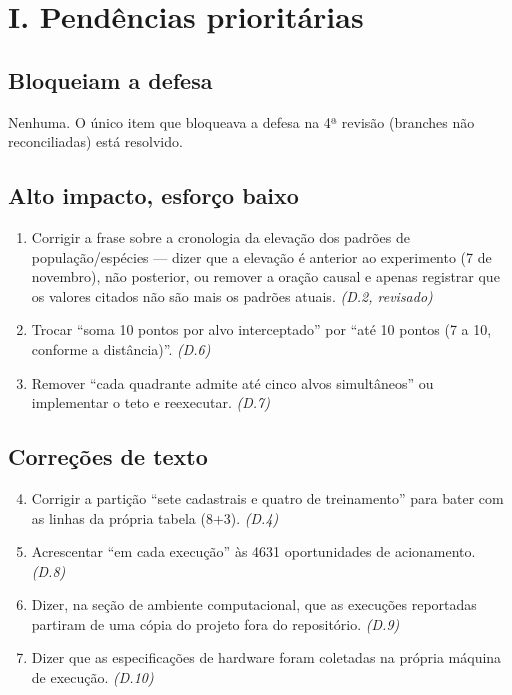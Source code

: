 \documentclass[11pt,a4paper]{article}
\begin{document}
\section*{I. Pendências prioritárias}

\subsection*{Bloqueiam a defesa}

Nenhuma. O único item que bloqueava a defesa na 4ª revisão (branches não reconciliadas) está resolvido.

\subsection*{Alto impacto, esforço baixo}

\begin{enumerate}
  \item Corrigir a frase sobre a cronologia da elevação dos padrões de população/espécies --- dizer
  que a elevação é anterior ao experimento (7 de novembro), não posterior, ou remover a oração causal
  e apenas registrar que os valores citados não são mais os padrões atuais. \emph{(D.2, revisado)}
  \item Trocar ``soma 10 pontos por alvo interceptado'' por ``até 10 pontos (7 a 10, conforme a
  distância)''. \emph{(D.6)}
  \item Remover ``cada quadrante admite até cinco alvos simultâneos'' ou implementar o teto e
  reexecutar. \emph{(D.7)}
\end{enumerate}

\subsection*{Correções de texto}

\begin{enumerate}\setcounter{enumi}{3}
  \item Corrigir a partição ``sete cadastrais e quatro de treinamento'' para bater com as linhas da
  própria tabela (8+3). \emph{(D.4)}
  \item Acrescentar ``em cada execução'' às 4631 oportunidades de acionamento. \emph{(D.8)}
  \item Dizer, na seção de ambiente computacional, que as execuções reportadas partiram de uma cópia
  do projeto fora do repositório. \emph{(D.9)}
  \item Dizer que as especificações de hardware foram coletadas na própria máquina de execução.
  \emph{(D.10)}
\end{enumerate}
\end{document}
